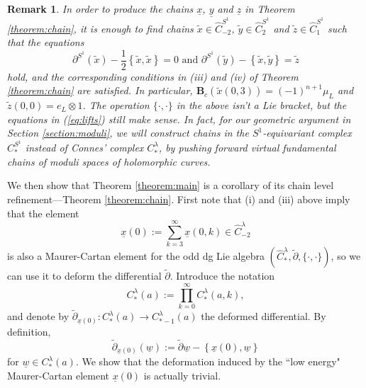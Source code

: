 \documentclass[a4paper]{article}
\newtheorem{remark}[theorem]{Remark}
\numberwithin{equation}{section}
\begin{document}
\begin{remark}\label{remark:lift1}
In order to produce the chains $\underline{x}$, $\underline{y}$ and $\underline{z}$ in Theorem \ref{theorem:chain}, it is enough to find chains $\tilde{x}\in\widehat{C}_{-2}^{S^1}$, $\tilde{y}\in\widehat{C}_2^{S^1}$ and $\tilde{z}\in\widehat{C}_1^{S^1}$ such that the equations
\begin{equation}\label{eq:lifts}
\partial^{S^1}(\tilde{x})-\frac{1}{2}\left\{\tilde{x},\tilde{x}\right\}=0\textrm{ and }\partial^{S^1}(\tilde{y})-\left\{\tilde{x},\tilde{y}\right\}=\tilde{z}
\end{equation}
hold, and the corresponding conditions in (iii) and (iv) of Theorem \ref{theorem:chain} are satisfied. In particular, $\mathbf{B}_c\left(\tilde{x}(0,3)\right)=(-1)^{n+1}\mu_L$ and $\tilde{z}(0,0)=e_L\otimes1$. The operation $\{\cdot,\cdot\}$ in the above isn't a Lie bracket, but the equations in (\ref{eq:lifts}) still make sense. In fact, for our geometric argument in Section \ref{section:moduli}, we will construct chains in the $S^1$-equivariant complex $C_\ast^{S^1}$ instead of Connes' complex $C_\ast^\lambda$, by pushing forward virtual fundamental chains of moduli spaces of holomorphic curves.
\end{remark}

We then show that Theorem \ref{theorem:main} is a corollary of its chain level refinement---Theorem \ref{theorem:chain}. First note that (i) and (iii) above imply that the element
\begin{equation}
\underline{x}(0):=\sum_{k=3}^\infty\underline{x}(0,k)\in\widehat{C}_{-2}^\lambda
\end{equation}
is also a Maurer-Cartan element for the odd dg Lie algebra $\left(\widehat{C}_\ast^\lambda,\tilde{\partial},\{\cdot,\cdot\}\right)$, so we can use it to deform the differential $\tilde{\partial}$. Introduce the notation
\begin{equation}
C_\ast^\lambda(a):=\prod_{k=0}^\infty C_\ast^\lambda(a,k),
\end{equation}
and denote by $\tilde{\partial}_{\underline{x}(0)}:C_\ast^\lambda(a)\rightarrow C_{\ast-1}^\lambda(a)$ the deformed differential. By definition,
\begin{equation}
\tilde{\partial}_{\underline{x}(0)}(\underline{w}):=\tilde{\partial}\underline{w}-\left\{\underline{x}(0),\underline{w}\right\}
\end{equation}
for $\underline{w}\in C_\ast^\lambda(a)$. We show that the deformation induced by the ``low energy" Maurer-Cartan element $\underline{x}(0)$ is actually trivial.
\end{document}
